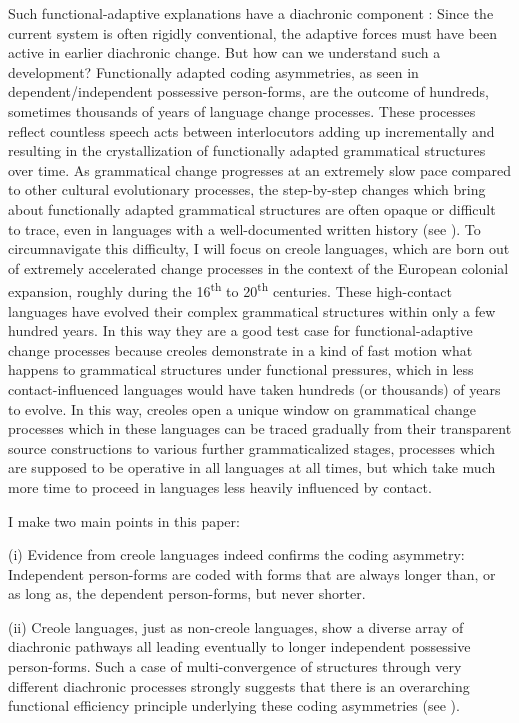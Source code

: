 \documentclass[output=paper]{langsci/langscibook}
\begin{document}
Such functional-adaptive explanations have a diachronic component \citep{Bybee1988}: Since the current system is often rigidly conventional, the adaptive forces must have been active in earlier diachronic change. But how can we understand such a development? Functionally adapted coding asymmetries, as seen in dependent/independent possessive person-forms, are the outcome of hundreds, sometimes thousands of years of language change processes. These processes reflect countless speech acts between interlocutors adding up incrementally and resulting in the crystallization of functionally adapted grammatical structures over time. As grammatical change progresses at an extremely slow pace compared to other cultural evolutionary processes, the step-by-step changes which bring about functionally adapted grammatical structures are often opaque or difficult to trace, even in languages with a well-documented written history (see \citealt{Seržant2019 [this volume]}). To circumnavigate this difficulty, I will focus on creole languages, which are born out of extremely accelerated change processes in the context of the European colonial expansion, roughly during the 16\textsuperscript{th} to 20\textsuperscript{th} centuries. These high-contact languages have evolved their complex grammatical structures within only a few hundred years. In this way they are a good test case for functional-adaptive change processes because creoles demonstrate in a kind of fast motion what happens to grammatical structures under functional pressures, which in less contact-influenced languages would have taken hundreds (or thousands) of years to evolve. In this way, creoles open a unique window on grammatical change processes which in these languages can be traced gradually from their transparent source constructions to various further grammaticalized stages, processes which are supposed to be operative in all languages at all times, but which take much more time to proceed in languages less heavily influenced by contact. 

I make two main points in this paper:

(i) Evidence from creole languages indeed confirms the coding asymmetry: Independent person-forms are coded with forms that are always longer than, or as long as, the dependent person-forms, but never shorter.

(ii) Creole languages, just as non-creole languages, show a diverse array of diachronic pathways all leading eventually to longer independent possessive person-forms. Such a case of multi-convergence of structures through very different diachronic processes strongly suggests that there is an overarching functional efficiency principle underlying these coding asymmetries (see \citealt{Haspelmath2019 [this volume]}). 
\end{document}
